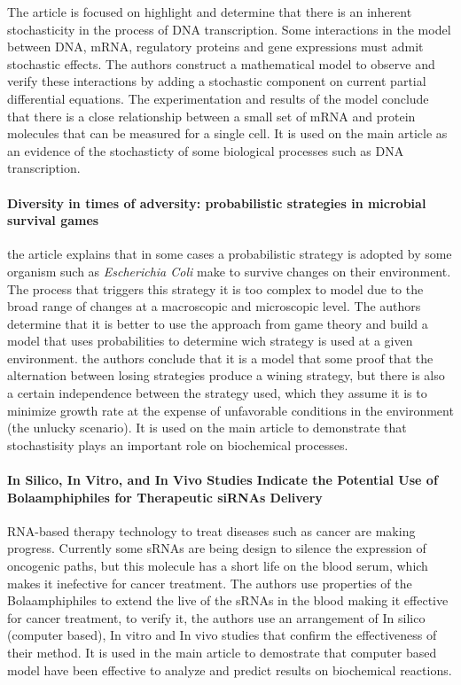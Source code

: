 \documentclass{article}
\begin{document}
The article is focused on highlight and determine that there is an inherent stochasticity in the process of DNA transcription. Some interactions in the model between DNA, mRNA, regulatory proteins and gene expressions must admit stochastic effects. The authors construct a mathematical model to observe and verify these interactions by adding a stochastic component on current partial differential equations. The experimentation and results of the model conclude that there is a close relationship between a small set of mRNA and protein molecules that can be measured for a single cell. It is used on the main article as an evidence of the stochasticty of some biological processes such as DNA transcription.

\paragraph{Diversity in times of adversity: probabilistic strategies in microbial survival games\cite{denise_m._wolf_diversity_2005}}

the article explains that in some cases a probabilistic strategy is adopted by some organism such as \textit{Escherichia Coli} make to survive changes on their environment. The process that triggers this strategy it is too complex to model due to the broad range of changes at a macroscopic and microscopic level. The authors determine that it is better to use the approach from game theory and build a model that uses probabilities to determine wich strategy is used at a given environment. the authors conclude that it is a model that some proof that the alternation between losing strategies produce a wining strategy, but there is also a certain independence between the strategy used, which they assume it is to minimize growth rate at the expense of unfavorable conditions in the environment (the unlucky scenario). It is used on the main article to demonstrate that stochastisity plays an important role on biochemical processes.

\paragraph{In Silico, In Vitro, and In Vivo Studies Indicate the Potential Use of Bolaamphiphiles for Therapeutic siRNAs Delivery\cite{taejin_kim_silico_2013}}

RNA-based therapy technology to treat diseases such as cancer are making progress. Currently some sRNAs are being design to silence the expression of oncogenic paths, but this molecule has a short life on the blood serum, which makes it inefective for cancer treatment. The authors use properties of the Bolaamphiphiles to extend the live of the sRNAs in the blood making it effective for cancer treatment, to verify it, the authors use an arrangement of In silico (computer based), In vitro and In vivo studies that confirm the effectiveness of their method. It is used in the main article to demostrate that computer based model have been effective to analyze and predict results on biochemical reactions.
\end{document}
